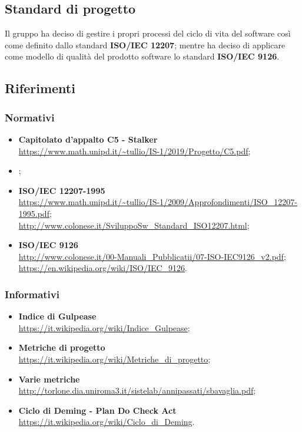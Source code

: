 \subsection{Standard di progetto}
Il gruppo \Gruppo{} ha deciso di gestire i propri processi del ciclo di vita del software così come definito dallo standard \textbf{ISO/IEC 12207}; 
mentre ha deciso di applicare come modello di qualità del prodotto software lo standard \textbf{ISO/IEC 9126}.

\subsection{Riferimenti}

\subsubsection{Normativi}
\begin{itemize}
    \item \textbf{Capitolato d'appalto C5 - Stalker}\\     
    \url{https://www.math.unipd.it/~tullio/IS-1/2019/Progetto/C5.pdf};
    \item \textbf{};
    \item \textbf{ISO/IEC 12207-1995}\\     
    \url{https://www.math.unipd.it/~tullio/IS-1/2009/Approfondimenti/ISO_12207-1995.pdf};\\
    \url{http://www.colonese.it/SviluppoSw_Standard_ISO12207.html};
    \item \textbf{ISO/IEC 9126}\\
    \url{http://www.colonese.it/00-Manuali_Pubblicatii/07-ISO-IEC9126_v2.pdf};\\
    \url{https://en.wikipedia.org/wiki/ISO/IEC_9126}.
\end{itemize}

\subsubsection{Informativi}
\begin{itemize}
    \item \textbf{Indice di Gulpease}\\
    \url{https://it.wikipedia.org/wiki/Indice_Gulpease};
    \item \textbf{Metriche di progetto}\\
    \url{https://it.wikipedia.org/wiki/Metriche_di_progetto};
    \item \textbf{Varie metriche}\\
    \url{http://torlone.dia.uniroma3.it/sistelab/annipassati/sbavaglia.pdf};
    \item \textbf{Ciclo di Deming - Plan Do Check Act}\\
    \url{https://it.wikipedia.org/wiki/Ciclo_di_Deming}.
\end{itemize}